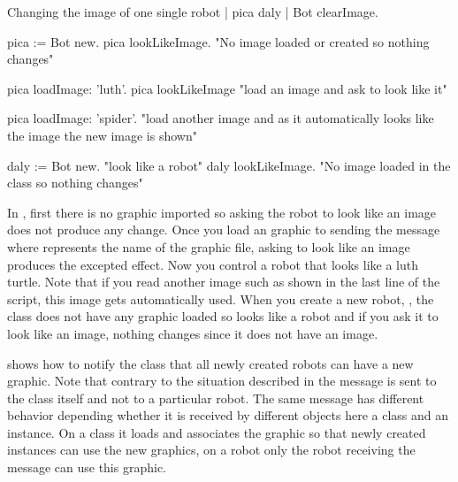 \begin{scriptwithtitle}{Changing the image of one single robot}\label{scr:Single}
| pica daly |
Bot clearImage. 

pica := Bot new.
pica lookLikeImage.
"No image loaded or created so nothing changes"

pica loadImage: 'luth'.
pica lookLikeImage
"load an image and ask to look like it"

pica loadImage: 'spider'.
"load another image and as it automatically looks like 
the image the new image is shown"

daly := Bot new.
"look like a robot"
daly lookLikeImage.
"No image loaded in the class so nothing changes"
\end{scriptwithtitle}

In , first there is no graphic imported so asking the robot  to look like an image does not produce any change. Once you load an graphic to  sending the message  where  represents the name of the graphic file, asking  to look like an image produces the excepted effect. Now you control a robot that looks like a luth turtle. Note that if you read another image such as shown in the last line of the script, this image gets automatically used. 
When you create a new robot, , the class does not have any graphic loaded so  looks like a robot and if you ask it to look like an image, nothing changes since it does not have an image.


%


 shows how to notify the class that all newly created robots can have a new graphic. Note that contrary to the situation described in  the message  is sent to the class  itself and not to a particular robot. The same message  has different behavior depending whether it is received by different objects here a class and an instance. On a class it loads and associates the graphic so that newly created instances can use the new graphics, on a robot only the robot receiving the message can use this graphic. 


